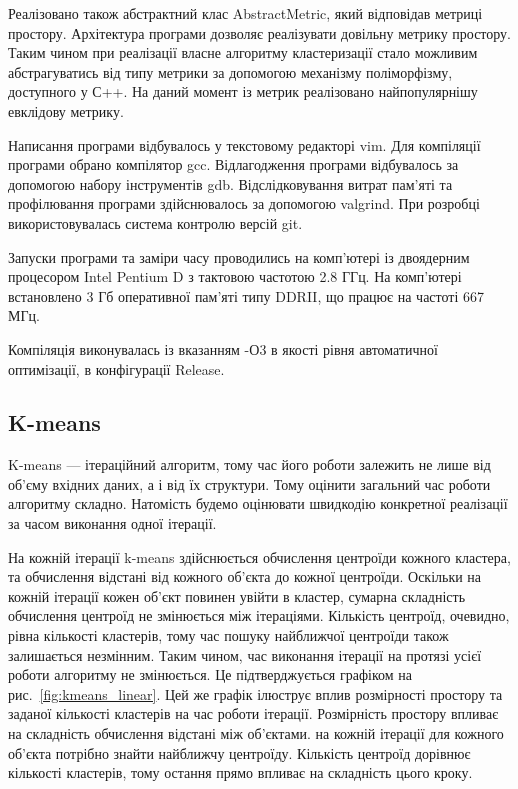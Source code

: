             Реалізовано також абстрактний клас AbstractMetric, який відповідав метриці простору. Архітектура програми дозволяє реалізувати довільну метрику простору. Таким чином при реалізації власне алгоритму кластеризації стало можливим абстрагуватись від типу метрики за допомогою механізму поліморфізму, доступного у С++. На даний момент із метрик реалізовано найпопулярнішу евклідову метрику.
            
            Написання програми відбувалось у текстовому редакторі vim. Для компіляції програми обрано компілятор gcc. Відлагодження програми відбувалось за допомогою набору інструментів gdb. Відслідковування витрат пам'яті та профілювання програми здійснювалось за допомогою valgrind. При розробці використовувалась система контролю версій git.
            
            Запуски програми та заміри часу проводились на комп’ютері із двоядерним процесором Intel Pentium D з тактовою частотою 2.8 ГГц. На комп’ютері встановлено 3 Гб оперативної пам’яті типу DDRII, що працює на частоті 667 МГц.
            
            Компіляція виконувалась із вказанням -О3 в якості рівня автоматичної оптимізації, в конфігурації Release.
            
            \subsection{K-means}
            
                K-means --- ітераційний алгоритм, тому час його роботи залежить не лише від об’єму вхідних даних, а і від їх структури. Тому оцінити загальний час роботи алгоритму складно. Натомість будемо оцінювати швидкодію конкретної реалізації за часом виконання одної ітерації. 
                
                На кожній ітерації k-means здійснюється обчислення центроїди кожного кластера, та обчислення відстані від кожного об’єкта до кожної центроїди. Оскільки на кожній ітерації кожен об’єкт повинен увійти в кластер, сумарна складність обчислення центроїд не змінюється між ітераціями. Кількість центроїд, очевидно, рівна кількості кластерів, тому час пошуку найближчої центроїди також залишається незмінним. Таким чином, час виконання ітерації на протязі усієї роботи алгоритму не змінюється. Це підтверджується графіком на рис.~\ref{fig:kmeans_linear}. Цей же графік ілюструє вплив розмірності простору та заданої кількості кластерів на час роботи ітерації. Розмірність простору впливає на складність обчислення відстані між об’єктами. на кожній ітерації для кожного об’єкта потрібно знайти найближчу центроїду. Кількість центроїд дорівнює кількості кластерів, тому остання прямо впливає на складність цього кроку.
                
